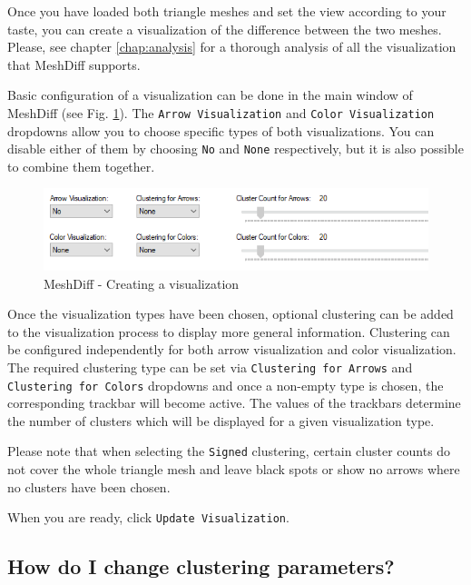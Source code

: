 Once you have loaded both triangle meshes and set the view according to your taste, you can create a visualization of the difference between the two meshes. Please, see chapter \ref{chap:analysis} for a thorough analysis of all the visualization that MeshDiff supports.

Basic configuration of a visualization can be done in the main window of MeshDiff (see Fig. \ref{fig:meshdiff-creating_visualization}). The \verb+Arrow Visualization+ and \verb+Color Visualization+ dropdowns allow you to choose specific types of both visualizations. You can disable either of them by choosing \verb+No+ and \verb+None+ respectively, but it is also possible to combine them together.

\begin{figure}[h]
	\centering
	\includegraphics[width=\textwidth]{./img/meshdiff-vis_settings.PNG}
	\caption[MeshDiff - Creating a visualization]{MeshDiff - Creating a visualization}
	\label{fig:meshdiff-creating_visualization}
\end{figure}

Once the visualization types have been chosen, optional clustering can be added to the visualization process to display more general information. Clustering can be configured independently for both arrow visualization and color visualization. The required clustering type can be set via \verb+Clustering for Arrows+ and \verb+Clustering for Colors+ dropdowns and once a non-empty type is chosen, the corresponding trackbar will become active. The values of the trackbars determine the number of clusters which will be displayed for a given visualization type.

Please note that when selecting the \verb+Signed+ clustering, certain cluster counts do not cover the whole triangle mesh and leave black spots or show no arrows where no clusters have been chosen.

When you are ready, click \verb+Update Visualization+.

\subsection{How do I change clustering parameters?}
\label{attch:user_doc-clustering_params}

